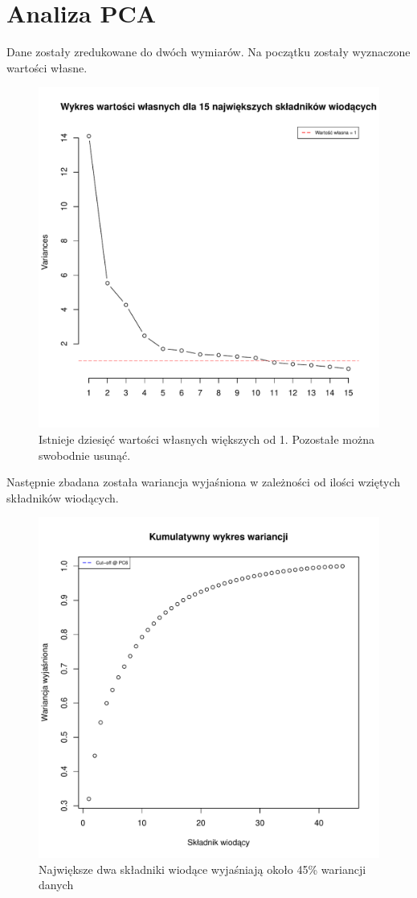 \documentclass[10pt,a4paper]{article}
\begin{document}
\section{Analiza PCA}
Dane zostały zredukowane do dwóch wymiarów. Na początku zostały wyznaczone wartości własne. 
\begin{figure}[H]
\includegraphics[scale=0.5]{wartosci_wlasne.pdf}
\caption{Istnieje dziesięć wartości własnych większych od 1. Pozostałe można swobodnie usunąć.}
\end{figure}

Następnie zbadana została wariancja wyjaśniona w zależności od ilości wziętych składników wiodących.
\begin{figure}[H]
\includegraphics[scale=0.5]{wariancja_kum.pdf}
\caption{Największe dwa składniki wiodące wyjaśniają około 45\% wariancji danych}
\end{figure}
\end{document}

